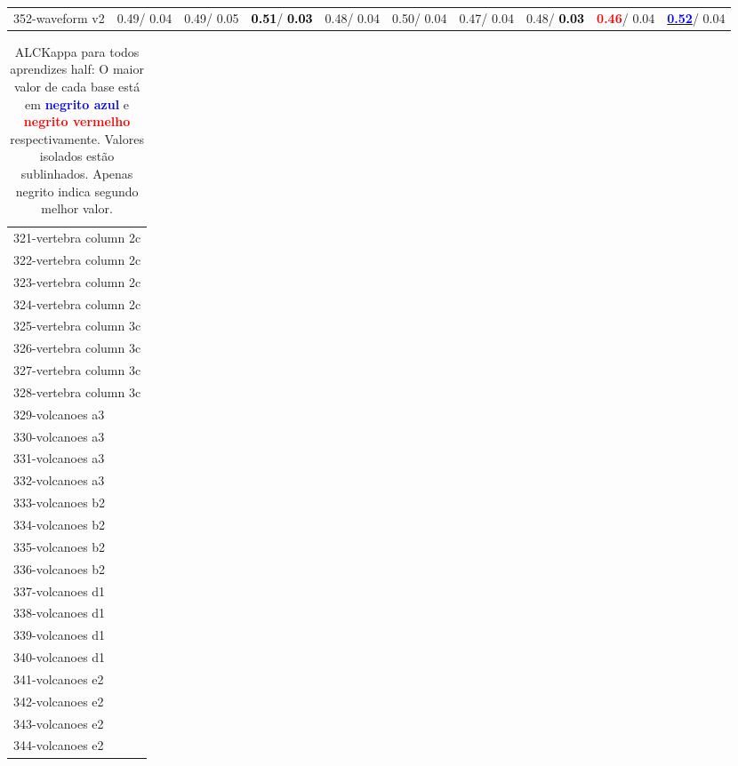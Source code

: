 \begin{table}[h]
\begin{center}
{\begin{tabular}{lc|c|c|c|c|c|c|c|c}
352-waveform v2 &   0.49/  0.04 &   0.49/  0.05 & \textcolor{black}{\textbf{  0.51}}/\textcolor{black}{\textbf{  0.03}} &   0.48/  0.04 &   0.50/  0.04 &   0.47/  0.04 &   0.48/\textcolor{black}{\textbf{  0.03}} & \textcolor{red}{\textbf{  0.46}}/  0.04 & \underline{\textcolor{blue}{\textbf{  0.52}}}/  0.04 \\\end{tabular}}\label{stratsALCKappa10AllRedux50a}
\end{center}
\end{table}
\begin{table}[h]
\caption{ALCKappa para todos aprendizes half: O maior valor de cada base está em \textcolor{blue}{\textbf{negrito azul}} e \textcolor{red}{\textbf{negrito vermelho}} respectivamente. Valores isolados estão sublinhados. Apenas negrito indica segundo melhor valor.}
\begin{center}\begin{tabular}{l}
 & \\ \hline 321-vertebra column 2c &  \\
322-vertebra column 2c &  \\
323-vertebra column 2c &  \\
324-vertebra column 2c &  \\
325-vertebra column 3c &  \\
326-vertebra column 3c &  \\
327-vertebra column 3c &  \\ \hline
328-vertebra column 3c &  \\
329-volcanoes a3 &  \\
330-volcanoes a3 &  \\
331-volcanoes a3 &  \\
332-volcanoes a3 &  \\
333-volcanoes b2 &  \\
334-volcanoes b2 &  \\ \hline
335-volcanoes b2 &  \\
336-volcanoes b2 &  \\
337-volcanoes d1 &  \\
338-volcanoes d1 &  \\
339-volcanoes d1 &  \\
340-volcanoes d1 &  \\
341-volcanoes e2 &  \\ \hline
342-volcanoes e2 &  \\
343-volcanoes e2 &  \\
344-volcanoes e2 &  \\

\end{tabular}
\end{center}
\end{table}
